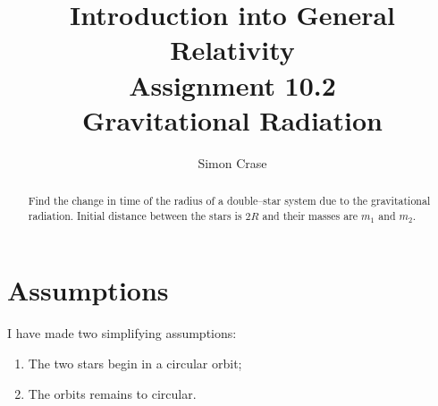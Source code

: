 \documentclass[]{article}
\title{Introduction into General Relativity\\Assignment 10.2\\Gravitational Radiation}
\author{Simon Crase}
\begin{document}
\maketitle
\tableofcontents

\begin{abstract}
Find the change in time of the radius of a double--star system due to the gravitational radiation. Initial distance between the stars is $2R$ and their masses are $m_1$ and $m_2$.

\end{abstract}

\section{Assumptions}
I have made two simplifying assumptions:
\begin{enumerate}
	\item The two stars begin in a circular orbit;
	\item The orbits remains to circular.
\end{enumerate}
\end{document}
